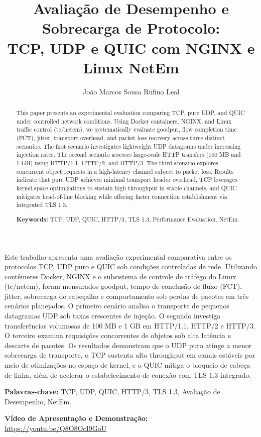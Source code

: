 \documentclass[12pt]{article}
\title{Avaliação de Desempenho e Sobrecarga de Protocolo:\\
       TCP, UDP e QUIC com NGINX e Linux NetEm}
\author{
  João Marcos Sousa Rufino Leal\inst{1}
}
\begin{document}
\maketitle

\begin{abstract}
This paper presents an experimental evaluation comparing TCP, pure UDP, and QUIC under controlled network conditions. Using Docker containers, NGINX, and Linux traffic control (tc/netem), we systematically evaluate goodput, flow completion time (FCT), jitter, transport overhead, and packet loss recovery across three distinct scenarios. The first scenario investigates lightweight UDP datagrams under increasing injection rates. The second scenario assesses large-scale HTTP transfers (100 MB and 1 GB) using HTTP/1.1, HTTP/2, and HTTP/3. The third scenario explores concurrent object requests in a high-latency channel subject to packet loss. Results indicate that pure UDP achieves minimal transport header overhead, TCP leverages kernel-space optimizations to sustain high throughput in stable channels, and QUIC mitigates head-of-line blocking while offering faster connection establishment via integrated TLS 1.3.

\vspace{0.15cm}
\noindent \textbf{Keywords:} TCP, UDP, QUIC, HTTP/3, TLS 1.3, Performance Evaluation, NetEm.
\end{abstract}

\begin{resumo}
Este trabalho apresenta uma avaliação experimental comparativa entre os protocolos TCP, UDP puro e QUIC sob condições controladas de rede. Utilizando contêineres Docker, NGINX e o subsistema de controle de tráfego do Linux (tc/netem), foram mensurados goodput, tempo de conclusão de fluxo (FCT), jitter, sobrecarga de cabeçalho e comportamento sob perdas de pacotes em três cenários planejados. O primeiro cenário analisa o transporte de pequenos datagramas UDP sob taxas crescentes de injeção. O segundo investiga transferências volumosas de 100 MB e 1 GB em HTTP/1.1, HTTP/2 e HTTP/3. O terceiro examina requisições concorrentes de objetos sob alta latência e descarte de pacotes. Os resultados demonstram que o UDP puro atinge a menor sobrecarga de transporte, o TCP sustenta alto throughput em canais estáveis por meio de otimizações no espaço de kernel, e o QUIC mitiga o bloqueio de cabeça de linha, além de acelerar o estabelecimento de conexão com TLS 1.3 integrado.

\vspace{0.15cm}
\noindent \textbf{Palavras-chave:} TCP, UDP, QUIC, HTTP/3, TLS 1.3, Avaliação de Desempenho, NetEm.

\vspace{0.25cm}
\noindent \textbf{Vídeo de Apresentação e Demonstração:} \\
\url{https://youtu.be/Q8O8OcI9GoU}
\end{resumo}
\end{document}
